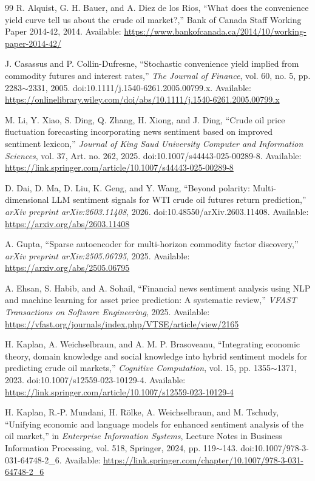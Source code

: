 \documentclass[journal]{IEEEtran}
\newcommand{\rng}{\ensuremath{\sim}}
\begin{document}
\begin{thebibliography}{99}
R. Alquist, G. H. Bauer, and A. Diez de los Rios, ``What does the convenience yield curve tell us about the crude oil market?,'' Bank of Canada Staff Working Paper 2014-42, 2014. Available: \url{https://www.bankofcanada.ca/2014/10/working-paper-2014-42/}

J. Casassus and P. Collin-Dufresne, ``Stochastic convenience yield implied from commodity futures and interest rates,'' \textit{The Journal of Finance}, vol. 60, no. 5, pp. 2283\rng{}2331, 2005. doi:10.1111/j.1540-6261.2005.00799.x. Available: \url{https://onlinelibrary.wiley.com/doi/abs/10.1111/j.1540-6261.2005.00799.x}

M. Li, Y. Xiao, S. Ding, Q. Zhang, H. Xiong, and J. Ding, ``Crude oil price fluctuation forecasting incorporating news sentiment based on improved sentiment lexicon,'' \textit{Journal of King Saud University Computer and Information Sciences}, vol. 37, Art. no. 262, 2025. doi:10.1007/s44443-025-00289-8. Available: \url{https://link.springer.com/article/10.1007/s44443-025-00289-8}

D. Dai, D. Ma, D. Liu, K. Geng, and Y. Wang, ``Beyond polarity: Multi-dimensional LLM sentiment signals for WTI crude oil futures return prediction,'' \textit{arXiv preprint arXiv:2603.11408}, 2026. doi:10.48550/arXiv.2603.11408. Available: \url{https://arxiv.org/abs/2603.11408}

A. Gupta, ``Sparse autoencoder for multi-horizon commodity factor discovery,'' \textit{arXiv preprint arXiv:2505.06795}, 2025. Available: \url{https://arxiv.org/abs/2505.06795}

A. Ehsan, S. Habib, and A. Sohail, ``Financial news sentiment analysis using NLP and machine learning for asset price prediction: A systematic review,'' \textit{VFAST Transactions on Software Engineering}, 2025. Available: \url{https://vfast.org/journals/index.php/VTSE/article/view/2165}

H. Kaplan, A. Weichselbraun, and A. M. P. Brasoveanu, ``Integrating economic theory, domain knowledge and social knowledge into hybrid sentiment models for predicting crude oil markets,'' \textit{Cognitive Computation}, vol. 15, pp. 1355\rng{}1371, 2023. doi:10.1007/s12559-023-10129-4. Available: \url{https://link.springer.com/article/10.1007/s12559-023-10129-4}

H. Kaplan, R.-P. Mundani, H. R\"olke, A. Weichselbraun, and M. Tschudy, ``Unifying economic and language models for enhanced sentiment analysis of the oil market,'' in \textit{Enterprise Information Systems}, Lecture Notes in Business Information Processing, vol. 518, Springer, 2024, pp. 119\rng{}143. doi:10.1007/978-3-031-64748-2\_6. Available: \url{https://link.springer.com/chapter/10.1007/978-3-031-64748-2_6}


\end{thebibliography}
\end{document}
